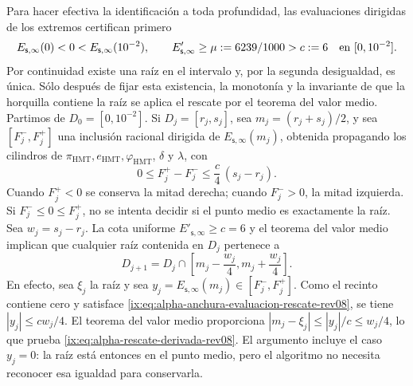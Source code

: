 Para hacer efectiva la identificación a toda profundidad, las evaluaciones
dirigidas de los extremos certifican primero
\[
 E_{\mathsf s,\infty}(0)<0<
 E_{\mathsf s,\infty}(10^{-2}),
 \qquad
 E'_{\mathsf s,\infty}\geq\mu:=6239/1000>c:=6
 \quad\hbox{en }[0,10^{-2}].
\]
Por continuidad existe una raíz en el intervalo y, por la segunda desigualdad,
es única. Sólo después de fijar esta existencia, la monotonía y la invariante
de que la horquilla contiene la raíz se aplica el rescate por el teorema del
valor medio. Partimos de \(D_0=[0,10^{-2}]\). Si
\(D_j=[r_j,s_j]\), sea \(m_j=(r_j+s_j)/2\), y sea
\([F_j^-,F_j^+]\) una inclusión racional dirigida de
\(E_{\mathsf s,\infty}(m_j)\), obtenida propagando los cilindros de
\(\pi_{\mathrm{HMT}},e_{\mathrm{HMT}},\varphi_{\mathrm{HMT}}\),
\(\delta\) y \(\lambda\), con
\begin{equation}
 0\leq F_j^+-F_j^-\leq \frac{c}{4}\,(s_j-r_j).
 \label{ix:eq:alpha-anchura-evaluacion-rescate-rev08}
\end{equation}
Cuando \(F_j^+<0\) se conserva la mitad derecha;
cuando \(F_j^->0\), la mitad izquierda. Si
\(F_j^-\leq0\leq F_j^+\), no se intenta decidir si el punto medio es
exactamente la raíz. Sea \(w_j=s_j-r_j\). La cota uniforme
\(E'_{\mathsf s,\infty}\geq c=6\) y el teorema del valor medio implican que
cualquier raíz contenida en \(D_j\) pertenece a
\begin{equation}
 D_{j+1}=D_j\cap
 \left[m_j-\frac{w_j}{4},
             m_j+\frac{w_j}{4}\right].
 \label{ix:eq:alpha-rescate-derivada-rev08}
\end{equation}
En efecto, sea \(\xi_j\) la raíz y sea
\(y_j=E_{\mathsf s,\infty}(m_j)\in[F_j^-,F_j^+]\). Como el recinto contiene
cero y satisface \eqref{ix:eq:alpha-anchura-evaluacion-rescate-rev08}, se tiene
\(|y_j|\leq cw_j/4\). El teorema del valor medio proporciona
\(|m_j-\xi_j|\leq |y_j|/c\leq w_j/4\), lo que prueba
\eqref{ix:eq:alpha-rescate-derivada-rev08}. El argumento incluye el caso
\(y_j=0\): la raíz está entonces en el punto medio, pero el algoritmo no
necesita reconocer esa igualdad para conservarla.

